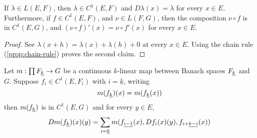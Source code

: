 \documentclass[../main-v2-manifolds.tex]{subfiles}
\begin{document}
\begin{wts}\label{prop:differentiating-linear-maps}
    If $\lambda\in L(E,F)$, then $\lambda\in C^1(E,F)$ and $D\lambda(x) = \lambda$ for every $x\in E$. Furthermore, if $f\in C^1(E,F)$, and $\nu\in L(F,G)$, then the composition $\nu\circ f$ is in $C^1(E,G)$, and $(\nu\circ f)'(x) = \nu\circ f'(x)$ for every $x\in E$.
\end{wts}
\begin{proof}
    See $\lambda(x+h) = \lambda(x) + \lambda(h) + 0$ at every $x\in E$. Using the chain rule (\cref{prop:chain-rule}) proves the second claim.
\end{proof}
\begin{wts}\label{prop:product-rule-k-variables}
    Let $m: \prod \UL{F}[k]\to G$ be a continuous $k$-linear map between Banach spaces $\UL{F}[k]$ and $G$. Suppose $f_i\in C^1(E, F_i)$ with $i=\underline{k}$, writing 
    \begin{equation}\label{eq:k-linear-multiplication-map-def}
        m(\UL{f}[k])(x) = m(\UL{f}[k](x))
    \end{equation}
    then $m(\UL{f}[k])$ is in $C^1(E,G)$ and for every $y\in E$,
    \begin{equation}\label{eq:k-linear-product-rule}
        Dm(\UL{f}[k])(x)(y) = \sum_{i=\underline{k}}m(\UL{f}[i-1](x),Df_i(x)(y),\UL{f}[i+][k-i](x))
    \end{equation}
\end{wts}
\end{document}
